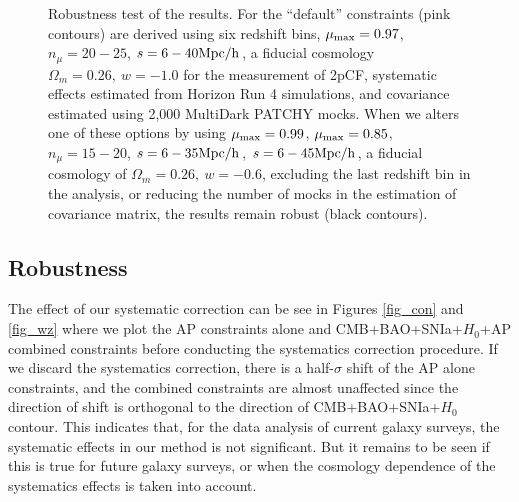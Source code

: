 \documentclass[iop]{emulateapj}
\begin{document}
\begin{figure}
   \caption{\label{fig_contest}
   Robustness test of the results.
   For the ``default'' constraints (pink contours) are derived using six redshift bins, 
   $\mu_{\rm max}=0.97$, $n_{\mu}=20-25$, $s=6 - 40 \rm Mpc/h$,
   a fiducial cosmology $\Omega_m=0.26,\ w=-1.0$ for the measurement of 2pCF,
   systematic effects estimated from Horizon Run 4 simulations, 
   and covariance estimated using 2,000 MultiDark PATCHY mocks.
   When we alters one of these options by using $\mu_{\rm max}=0.99$, 
   $\mu_{\rm max}=0.85$, $n_{\mu}=15-20$, $s=6 - 35 \rm Mpc/h$, $s=6 - 45 \rm Mpc/h$,  
   a fiducial cosmology of $\Omega_m=0.26,\ w=-0.6$, 
   excluding the last redshift bin in the analysis, 
   or reducing the number of mocks in the estimation of covariance matrix,
   the results remain robust (black contours).
   }
\end{figure}

\subsection{Robustness}

The effect of our systematic correction can be see in Figures \ref{fig_con} and \ref{fig_wz} where we plot the AP constraints alone and CMB+BAO+SNIa+$H_0$+AP combined constraints 
before conducting the systematics correction procedure.
If we discard the systematics correction, there is a half-$\sigma$ shift of the AP alone constraints,
and the combined constraints are almost unaffected
since the direction of shift is orthogonal to the direction of CMB+BAO+SNIa+$H_0$ contour.
This indicates that, for the data analysis of current galaxy surveys,
the systematic effects in our method is not significant. 
But it remains to be seen if this is true for future galaxy surveys,
or when the cosmology dependence of the systematics effects is taken into account.
\end{document}
